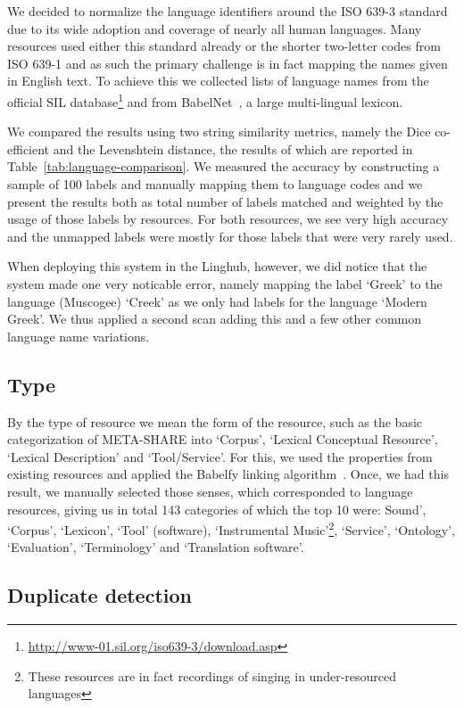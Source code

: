 \documentclass[smallextended]{svjour3}       %
\begin{document}
We decided to normalize the language identifiers around the ISO 639-3 standard
due to its wide adoption and coverage of nearly all human languages. Many
resources used either this standard already or the shorter two-letter codes from
ISO 639-1 and as such the primary challenge is in fact mapping the names given
in English text. To achieve this we collected lists of language names from the
official SIL
database\footnote{\url{http://www-01.sil.org/iso639-3/download.asp}} and from
BabelNet~\cite{}, a large multi-lingual lexicon.

We compared the results using two string similarity metrics, namely the Dice
co-efficient and the Levenshtein distance, the results of which are reported in
Table~\ref{tab:language-comparison}. We measured the accuracy by constructing a
sample of 100 labels and manually mapping them to language codes and we present
the results both as total number of labels matched and weighted by the usage of
those labels by resources. For both resources, we see very high accuracy and the
unmapped labels were mostly for those labels that were very rarely used. 

When deploying this system in the Linghub, however, we did notice that the
system made one very noticable error, namely mapping the label `Greek' to the
language (Muscogee) `Creek' as we only had labels for the language `Modern
Greek'. We thus applied a second scan adding this and a few other common
language name variations.

\subsection{Type}

By the type of resource we mean the form of the resource, such as the basic
categorization of META-SHARE into `Corpus', `Lexical Conceptual Resource', 
`Lexical Description' and `Tool/Service'. For this, we used the properties from
existing resources and applied the Babelfy linking algorithm~\cite{}. Once, we
had this result, we manually selected those senses, which corresponded to
language resources, giving us in total 143 categories of which the top 10 were:
Sound', `Corpus',
`Lexicon', `Tool' (software), `Instrumental Music'\footnote{These
resources are in fact recordings of singing in under-resourced languages},
`Service', `Ontology', `Evaluation',
`Terminology' and `Translation software'.


\subsection{Duplicate detection}
\end{document}
